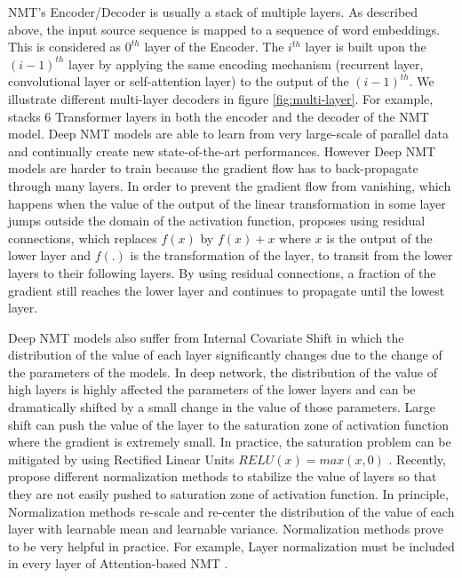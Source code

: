 NMT's Encoder/Decoder is usually a stack of multiple layers. As described above, the input source sequence is mapped to a sequence of word embeddings. This is considered as $0^{th}$ layer of the Encoder. The $i^{th}$ layer is built upon the $(i-1)^{th}$ layer by applying the same encoding mechanism (recurrent layer, convolutional layer or self-attention layer) to the output of the $(i-1)^{th}$. We illustrate different multi-layer decoders in figure \ref{fig:multi-layer}. For example, \cite{Vaswani17attention} stacks 6 Transformer layers in both the encoder and the decoder of the NMT model. Deep NMT models are able to learn from very large-scale of parallel data \cite{Ott18scaling} and continually create new state-of-the-art performances. However Deep NMT models are harder to train because the gradient flow has to back-propagate through many layers. In order to prevent the gradient flow from vanishing, which happens when the value of the output of the linear transformation in some layer jumps outside the domain of the activation function, \citep{He16deep} proposes using residual connections, which replaces $f(x)$ by $f(x)+x$ where $x$ is the output of the lower layer and $f(.)$ is the transformation of the layer, to transit from the lower layers to their following layers. By using residual connections, a fraction of the gradient still reaches the lower layer and continues to propagate until the lowest layer.

Deep NMT models also suffer from Internal Covariate Shift in which the distribution of the value of each layer significantly changes due to the change of the parameters of the models. In deep network, the distribution of the value of high layers is highly affected the parameters of the lower layers and can be dramatically shifted by a small change in the value of those parameters. Large shift can push the value of the layer to the saturation zone of activation function where the gradient is extremely small. In practice, the saturation problem can be mitigated by using Rectified Linear Units $RELU(x) = max(x,0)$ \cite{Nair10rectified}. Recently, \cite{Ioffe15batch,Jimmy16layer} propose different normalization methods to stabilize the value of layers so that they are not easily pushed to saturation zone of activation function. In principle, Normalization methods re-scale and re-center the distribution of the value of each layer with learnable mean and learnable variance. Normalization methods prove to be very helpful in practice. For example, Layer normalization must be included in every layer of Attention-based NMT \cite{Vaswani17attention}.

